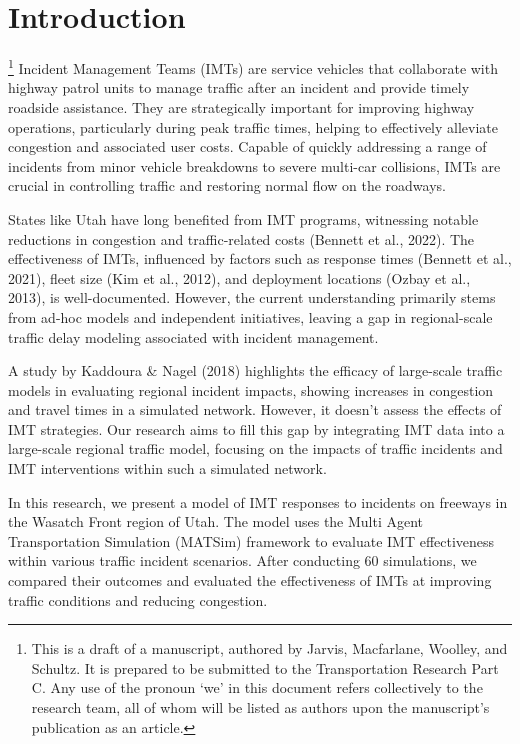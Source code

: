 \documentclass[fancy, oneside, mastersfancy, ms]{byuthesis}
\begin{document}
\hypertarget{introduction}{%
\chapter{Introduction}\label{introduction}}

\footnote{This is a draft of a manuscript, authored by Jarvis,
  Macfarlane, Woolley, and Schultz. It is prepared to be submitted to
  the Transportation Research Part C. Any use of the pronoun `we' in
  this document refers collectively to the research team, all of whom
  will be listed as authors upon the manuscript's publication as an
  article.} Incident Management Teams (IMTs) are service vehicles that
collaborate with highway patrol units to manage traffic after an
incident and provide timely roadside assistance. They are strategically
important for improving highway operations, particularly during peak
traffic times, helping to effectively alleviate congestion and
associated user costs. Capable of quickly addressing a range of
incidents from minor vehicle breakdowns to severe multi-car collisions,
IMTs are crucial in controlling traffic and restoring normal flow on the
roadways.

States like Utah have long benefited from IMT programs, witnessing
notable reductions in congestion and traffic-related costs (Bennett et
al., 2022). The effectiveness of IMTs, influenced by factors such as
response times (Bennett et al., 2021), fleet size (Kim et al., 2012),
and deployment locations (Ozbay et al., 2013), is well-documented.
However, the current understanding primarily stems from ad-hoc models
and independent initiatives, leaving a gap in regional-scale traffic
delay modeling associated with incident management.

A study by Kaddoura \& Nagel (2018) highlights the efficacy of
large-scale traffic models in evaluating regional incident impacts,
showing increases in congestion and travel times in a simulated network.
However, it doesn't assess the effects of IMT strategies. Our research
aims to fill this gap by integrating IMT data into a large-scale
regional traffic model, focusing on the impacts of traffic incidents and
IMT interventions within such a simulated network.

In this research, we present a model of IMT responses to incidents on
freeways in the Wasatch Front region of Utah. The model uses the Multi
Agent Transportation Simulation (MATSim) framework to evaluate IMT
effectiveness within various traffic incident scenarios. After
conducting 60 simulations, we compared their outcomes and evaluated the
effectiveness of IMTs at improving traffic conditions and reducing
congestion.
\end{document}
